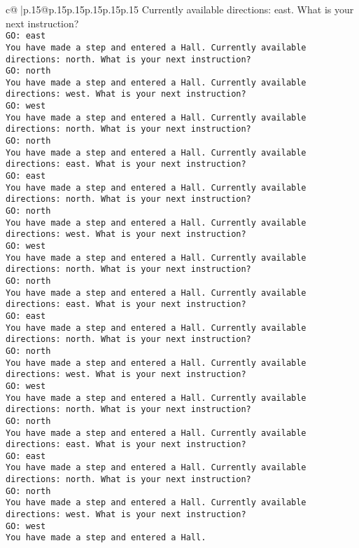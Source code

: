 \documentclass{article}
\begin{document}
{\begin{supertabular}{c@{$\;$}|p{.15\linewidth}@{}p{.15\linewidth}p{.15\linewidth}p{.15\linewidth}p{.15\linewidth}p{.15\linewidth}}
{{{Currently available directions: east. What is your next instruction?\\ \tt GO: east\\ \tt You have made a step and entered a Hall. Currently available directions: north. What is your next instruction?\\ \tt GO: north\\ \tt You have made a step and entered a Hall. Currently available directions: west. What is your next instruction?\\ \tt GO: west\\ \tt You have made a step and entered a Hall. Currently available directions: north. What is your next instruction?\\ \tt GO: north\\ \tt You have made a step and entered a Hall. Currently available directions: east. What is your next instruction?\\ \tt GO: east\\ \tt You have made a step and entered a Hall. Currently available directions: north. What is your next instruction?\\ \tt GO: north\\ \tt You have made a step and entered a Hall. Currently available directions: west. What is your next instruction?\\ \tt GO: west\\ \tt You have made a step and entered a Hall. Currently available directions: north. What is your next instruction?\\ \tt GO: north\\ \tt You have made a step and entered a Hall. Currently available directions: east. What is your next instruction?\\ \tt GO: east\\ \tt You have made a step and entered a Hall. Currently available directions: north. What is your next instruction?\\ \tt GO: north\\ \tt You have made a step and entered a Hall. Currently available directions: west. What is your next instruction?\\ \tt GO: west\\ \tt You have made a step and entered a Hall. Currently available directions: north. What is your next instruction?\\ \tt GO: north\\ \tt You have made a step and entered a Hall. Currently available directions: east. What is your next instruction?\\ \tt GO: east\\ \tt You have made a step and entered a Hall. Currently available directions: north. What is your next instruction?\\ \tt GO: north\\ \tt You have made a step and entered a Hall. Currently available directions: west. What is your next instruction?\\ \tt GO: west\\ \tt You have made a step and entered a Hall. }}}
\end{supertabular}}
\end{document}
